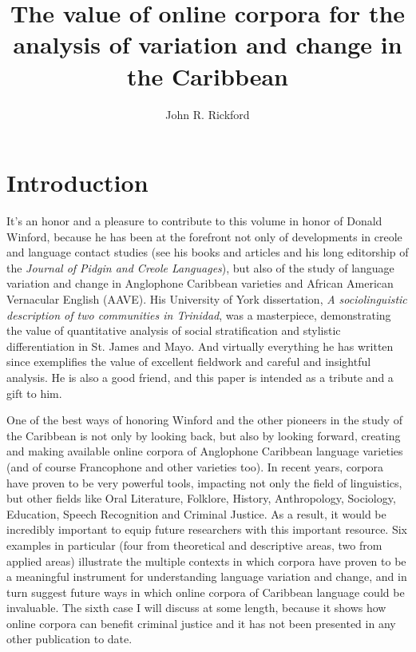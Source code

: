 \documentclass[output=paper,colorlinks,citecolor=brown]{langscibook}
\author{John R. Rickford\affiliation{Stanford University}}
\title{The value of online corpora for the analysis of variation and change in the Caribbean}
\begin{document}
\maketitle

\section{Introduction}

 It's an honor and a pleasure to contribute to this volume in honor of Donald Winford, because he has been at the forefront not only of developments in creole and language contact studies (see his books and articles and his long editorship of the \textit{Journal of Pidgin and Creole Languages}), but also of the study of language variation and change in Anglophone Caribbean varieties and African American Vernacular English (AAVE).  His \citeyear{Winford1972} University of York dissertation, \textit{A sociolinguistic description of two communities in Trinidad}, was a masterpiece, demonstrating the value of quantitative analysis of social stratification and stylistic differentiation in St. James and Mayo. And virtually everything he has written since exemplifies the value of excellent fieldwork and careful and insightful analysis.  He is also a good friend, and this paper is intended as a tribute and a gift to him.

 One of the best ways of honoring Winford and the other pioneers in the study of the Caribbean is not only by looking back, but also by looking forward, creating and making available online corpora of Anglophone Caribbean language varieties (and of course Francophone and other varieties too). In recent years, corpora have proven to be very powerful tools, impacting not only the field of linguistics, but other fields like Oral Literature, Folklore, History, Anthropology, Sociology, Education, Speech Recognition and Criminal Justice. As a result, it would be incredibly important to equip future researchers with this important resource. Six examples in particular (four from theoretical and descriptive areas, two from applied areas) illustrate the multiple contexts in which corpora have proven to be a meaningful instrument for understanding language variation and change, and in turn suggest future ways in which online corpora of Caribbean language could be invaluable.   The sixth case I will discuss at some length,  because it shows how online corpora can benefit criminal justice and it has not been presented in any other publication to date. 
\end{document}

